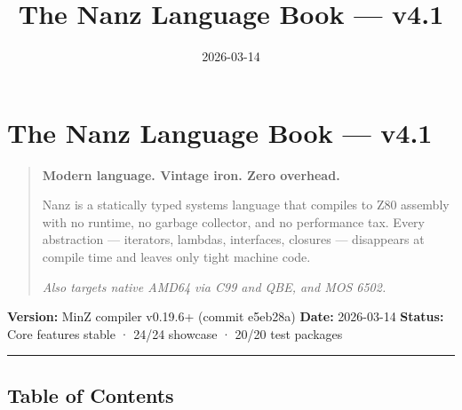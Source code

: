 \documentclass[
  11pt,
]{article}
\title{The Nanz Language Book --- v4.1}
\author{}
\date{2026-03-14}
\begin{document}
\maketitle

{
\hypersetup{linkcolor=black}
\setcounter{tocdepth}{3}
\tableofcontents
}
\section{The Nanz Language Book ---
v4.1}\label{the-nanz-language-book-v4.1}

\begin{quote}
\textbf{Modern language. Vintage iron. Zero overhead.}

Nanz is a statically typed systems language that compiles to Z80
assembly with no runtime, no garbage collector, and no performance tax.
Every abstraction --- iterators, lambdas, interfaces, closures ---
disappears at compile time and leaves only tight machine code.

\emph{Also targets native AMD64 via C99 and QBE, and MOS 6502.}
\end{quote}

\textbf{Version:} MinZ compiler v0.19.6+ (commit e5eb28a) \textbf{Date:}
2026-03-14 \textbf{Status:} Core features stable · 24/24 showcase ·
20/20 test packages

\begin{center}\rule{0.5\linewidth}{0.5pt}\end{center}

\subsection{Table of Contents}\label{table-of-contents}
\end{document}
